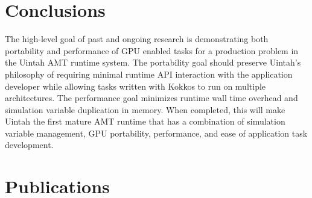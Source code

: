 \documentclass[12pt]{article}
\begin{document}
\section{Conclusions}
\label{ch:conclusions}

The high-level goal of past and ongoing research is demonstrating both portability and performance of GPU enabled tasks for a production problem in the Uintah AMT runtime system.  The portability goal should preserve Uintah's philosophy of requiring minimal runtime API interaction with the application developer while allowing tasks written with Kokkos to run on multiple architectures.  The performance goal minimizes runtime wall time overhead and simulation variable duplication in memory.   When completed, this will make Uintah the first mature AMT runtime that has a combination of simulation variable management, GPU portability, performance, and ease of application task development. 

\section{Publications}
\end{document}
